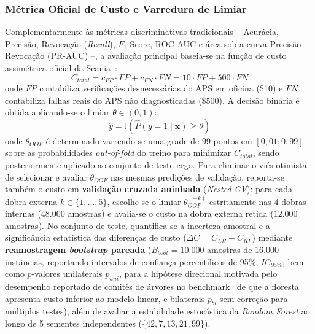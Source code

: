\documentclass[conference]{IEEEtran}
\begin{document}
\subsubsection{Métrica Oficial de Custo e Varredura de Limiar}
Complementarmente às métricas discriminativas tradicionais -- Acurácia, Precisão, Revocação (\textit{Recall}), $F_1$-Score, ROC-AUC e área sob a curva Precisão--Revocação (PR-AUC) --, a avaliação principal baseia-se na função de custo assimétrica oficial da Scania~\cite{scania_dataset}:
\begin{equation}
    C_{total} = c_{FP} \cdot FP + c_{FN} \cdot FN = 10 \cdot FP + 500 \cdot FN
    \label{eq:custo_scania}
\end{equation}
onde $FP$ contabiliza verificações desnecessárias do APS em oficina (\$10) e $FN$ contabiliza falhas reais do APS não diagnosticadas (\$500). A decisão binária é obtida aplicando-se o limiar $\theta \in (0,1)$:
\begin{equation}
    \hat{y} = \mathbb{I}\left(\hat{P}(y=1 \mid \mathbf{x}) \ge \theta\right)
\end{equation}
onde $\theta_{OOF}$ é determinado varrendo-se uma grade de 99 pontos em $[0{,}01; 0{,}99]$ sobre as probabilidades \textit{out-of-fold} do treino para minimizar $C_{total}$, sendo posteriormente aplicado ao conjunto de teste cego. Para eliminar o viés otimista de selecionar e avaliar $\theta_{OOF}$ nas mesmas predições de validação, reporta-se também o custo em \textbf{validação cruzada aninhada} (\textit{Nested CV}): para cada dobra externa $k \in \{1,\dots,5\}$, escolhe-se o limiar $\theta^{(-k)}_{OOF}$ estritamente nas 4 dobras internas ($48.000$ amostras) e avalia-se o custo na dobra externa retida ($12.000$ amostras). No conjunto de teste, quantifica-se a incerteza amostral e a significância estatística das diferenças de custo ($\Delta C = C_{LR} - C_{RF}$) mediante \textbf{reamostragem \textit{bootstrap} pareada} ($B_{boot} = 10.000$ amostras de $16.000$ instâncias, reportando intervalos de confiança percentílicos de 95\%, $IC_{95\%}$, bem como $p$-valores unilaterais $p_{uni}$, para a hipótese direcional motivada pelo desempenho reportado de comitês de árvores no benchmark~\cite{costa2016ida,gondek2016prediction,rafsunjani2019} de que a floresta apresenta custo inferior ao modelo linear, e bilaterais $p_{bi}$ sem correção para múltiplos testes), além de avaliar a estabilidade estocástica da \textit{Random Forest} ao longo de 5 sementes independentes ($\{42, 7, 13, 21, 99\}$).
\end{document}
